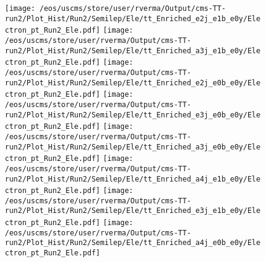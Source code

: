 \begin{figure}
\texttt{[image: /eos/uscms/store/user/rverma/Output/cms-TT-run2/Plot\_Hist/Run2/Semilep/Ele/tt\_Enriched\_e2j\_e1b\_e0y/Electron\_pt\_Run2\_Ele.pdf]}
\texttt{[image: /eos/uscms/store/user/rverma/Output/cms-TT-run2/Plot\_Hist/Run2/Semilep/Ele/tt\_Enriched\_a3j\_e1b\_e0y/Electron\_pt\_Run2\_Ele.pdf]}
\texttt{[image: /eos/uscms/store/user/rverma/Output/cms-TT-run2/Plot\_Hist/Run2/Semilep/Ele/tt\_Enriched\_e2j\_e0b\_e0y/Electron\_pt\_Run2\_Ele.pdf]}
\texttt{[image: /eos/uscms/store/user/rverma/Output/cms-TT-run2/Plot\_Hist/Run2/Semilep/Ele/tt\_Enriched\_e3j\_e0b\_e0y/Electron\_pt\_Run2\_Ele.pdf]}
\texttt{[image: /eos/uscms/store/user/rverma/Output/cms-TT-run2/Plot\_Hist/Run2/Semilep/Ele/tt\_Enriched\_a3j\_e0b\_e0y/Electron\_pt\_Run2\_Ele.pdf]}
\texttt{[image: /eos/uscms/store/user/rverma/Output/cms-TT-run2/Plot\_Hist/Run2/Semilep/Ele/tt\_Enriched\_a4j\_e1b\_e0y/Electron\_pt\_Run2\_Ele.pdf]}
\texttt{[image: /eos/uscms/store/user/rverma/Output/cms-TT-run2/Plot\_Hist/Run2/Semilep/Ele/tt\_Enriched\_e3j\_e1b\_e0y/Electron\_pt\_Run2\_Ele.pdf]}
\texttt{[image: /eos/uscms/store/user/rverma/Output/cms-TT-run2/Plot\_Hist/Run2/Semilep/Ele/tt\_Enriched\_a4j\_e0b\_e0y/Electron\_pt\_Run2\_Ele.pdf]}
\end{figure}

